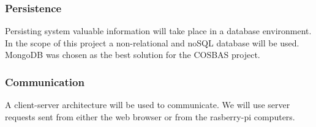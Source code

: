 \subsubsection{Persistence}
Persisting system valuable information will take place in a database environment. In the scope of this project a non-relational and noSQL database will be used. MongoDB was chosen as the best solution for the COSBAS project.

\subsubsection{Communication}
A client-server architecture will be used to communicate. We will use server requests sent from either the web browser or from the rasberry-pi computers.